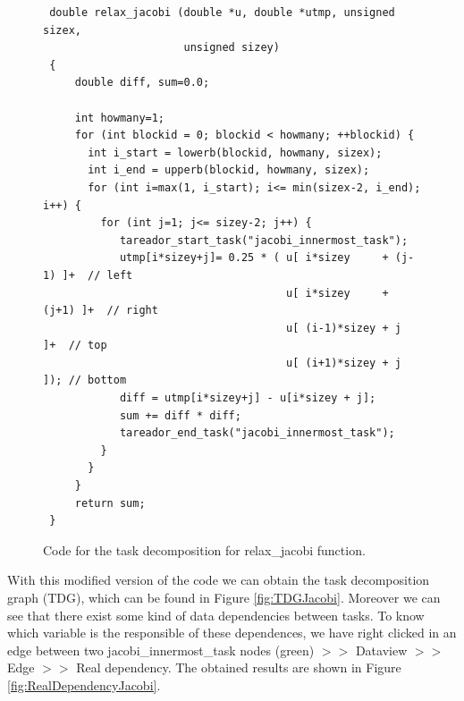 \documentclass[12pt, a4paper]{article}
\begin{document}
\begin{figure}[H]
\hspace{-0.5cm}
\begin{lstlisting}
 double relax_jacobi (double *u, double *utmp, unsigned sizex,
 				      unsigned sizey)
 {
     double diff, sum=0.0;
   
     int howmany=1;
     for (int blockid = 0; blockid < howmany; ++blockid) {
       int i_start = lowerb(blockid, howmany, sizex);
       int i_end = upperb(blockid, howmany, sizex);
       for (int i=max(1, i_start); i<= min(sizex-2, i_end); i++) {
         for (int j=1; j<= sizey-2; j++) {
 			tareador_start_task("jacobi_innermost_task");
 			utmp[i*sizey+j]= 0.25 * ( u[ i*sizey     + (j-1) ]+  // left
 							   		  u[ i*sizey     + (j+1) ]+  // right
 	   								  u[ (i-1)*sizey + j     ]+  // top
 				   					  u[ (i+1)*sizey + j     ]); // bottom
 			diff = utmp[i*sizey+j] - u[i*sizey + j]; 
 			sum += diff * diff;
		 	tareador_end_task("jacobi_innermost_task");
	     }
       }
     }
     return sum;
 }
\end{lstlisting}
\label{code:tareador-relax-jacobi}
\caption{Code for the task decomposition for relax\_jacobi function.}
\end{figure}

With this modified version of the code we can obtain the task decomposition graph (TDG), which can be found in Figure \ref{fig:TDGJacobi}. Moreover we can see that there exist some kind of data dependencies between tasks. To know which variable is the responsible of these dependences, we have right clicked in an edge between two jacobi\_innermost\_task nodes (green) $>>$ Dataview $>>$ Edge $>>$ Real dependency. The obtained results are shown in Figure \ref{fig:RealDependencyJacobi}.
\end{document}
